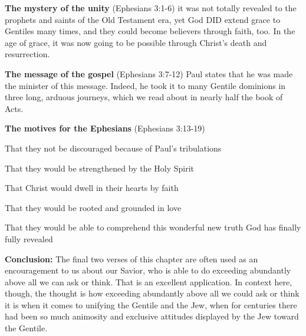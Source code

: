 \begin{compactenum}[I.]
    \item \textbf{The mystery of the unity}  (Ephesians 3:1-6) it was not totally revealed to the prophets and saints of the Old Testament era, yet God DID extend grace to Gentiles many times, and they could become believers through faith, too. In the age of grace, it was now going to be possible through Christ’s death and resurrection.
    \item \textbf{The message of the gospel}  (Ephesians 3:7-12) Paul states that he was made the minister of this message. Indeed, he took it to many Gentile dominions in three long, arduous journeys, which we read about in nearly half the book of Acts.
    \item \textbf{The motives for the Ephesians}  (Ephesians 3:13-19)
    \begin{compactenum}[A.]
    	\item That they not be discouraged because of Paul’s tribulations
    	\item That they would be strengthened by the Holy Spirit
    	\item That Christ would dwell in their hearts by faith
    	\item That they would be rooted and grounded in love
    	\item That they would be able to comprehend this wonderful new truth God has finally fully revealed
    \end{compactenum}
\end{compactenum}
\textbf{Conclusion:} The final two verses of this chapter are often used as an encouragement to us about our Savior, who is able to do exceeding abundantly above all we can ask or think. That is an excellent application. In context here, though, the thought is how exceeding abundantly above all we could ask or think it is when it comes to unifying the Gentile and the Jew, when for centuries there had been so much animosity and exclusive attitudes displayed by the Jew toward the Gentile.

